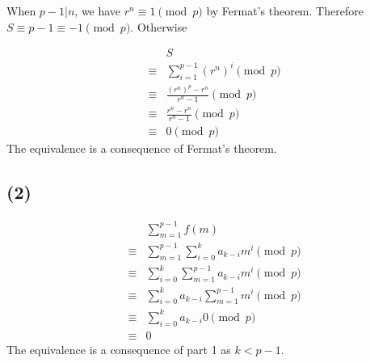 \documentclass{article}
\begin{document}
When $ p - 1 | n $, we have $ r^n \equiv 1 \pmod{p} $ by Fermat's theorem. Therefore $ S \equiv p - 1 \equiv -1 \pmod{p} $. Otherwise

\begin{eqnarray*}
  & & S                                              \\
  &\equiv& \sum\limits_{i = 1}^{p-1}(r^n)^i \pmod{p} \\
  &\equiv& \frac{(r^n)^p - r^n}{r^n - 1}    \pmod{p} \\
  &\equiv& \frac{r^n - r^n}{r^n - 1}        \pmod{p} \\
  &\equiv& 0                                \pmod{p} 
\end{eqnarray*}
The  equivalence is a consequence of Fermat's theorem.
\subsection*{(2)}
\begin{eqnarray*}
  &      & \sum\limits_{m = 1}^{p-1}f(m) \\
  &\equiv& \sum\limits_{m = 1}^{p-1}\sum\limits_{i = 0}^{k}a_{k-i} m^i \pmod{p} \\
  &\equiv& \sum\limits_{i = 0}^{k}\sum\limits_{m = 1}^{p-1}a_{k-i} m^i \pmod{p} \\
  &\equiv& \sum\limits_{i = 0}^{k}a_{k-i}\sum\limits_{m = 1}^{p-1} m^i \pmod{p} \\
  &\equiv& \sum\limits_{i = 0}^{k}a_{k-i} 0 \pmod{p} \\
  &\equiv& 0
\end{eqnarray*}
The  equivalence is a consequence of part 1 as $ k < p - 1 $.
\end{document}
